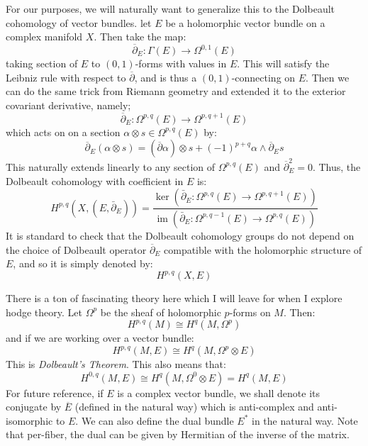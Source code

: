 \documentclass{book}
\newcommand{\im}{{\operatorname{im}}}
\begin{document}
For our purposes, we will naturally want to generalize this to the Dolbeault cohomology of vector bundles. let
$E$ be a holomorphic vector bundle on a complex manifold $X$. Then take the map:
\[
  \overline{\partial}_E: \Gamma(E) \to \Omega^{0,1}(E)
\]
taking section of $E$ to $(0,1)$-forms with values in $E$. This will satisfy the Leibniz rule  with respect to
$\overline{\partial}$, and is thus a $(0,1)$-connecting on $E$. Then we can do the same trick from Riemann
geometry and extended it to  the exterior covariant derivative, namely;
\[
  \overline{\partial}_E: \Omega^{p,q}(E) \to \Omega^{p, q+1}(E)
\]
which acts on on a section $\alpha \otimes s \in \Omega^{p,q}(E)$ by:
\[
  \overline{\partial}_E(\alpha\otimes s) = (\overline{\partial}\alpha) \otimes s + (-1)^{p+q}\alpha \wedge
  \overline{\partial}_E s
\]
This naturally extends linearly to any section of $\Omega^{p,q}(E)$ and $\overline{\partial}_E^2 = 0$. Thus,
the Dolbeault cohomology with coefficient in $E$ is:
\[
H^{p,q}(X,(E,\bar{\partial}_E)) = \frac{\ker(\bar{\partial}_E : \Omega^{p,q}(E) \to \Omega^{p,q+1}(E))}{\im(\bar{\partial}_E : \Omega^{p,q-1}(E) \to \Omega^{p,q}(E))}
\]
It is standard to check that the Dolbeault cohomology groups do not depend on the choice of Dolbeault operator
$\overline{\partial}_E$ compatible with the holomorphic structure of $E$, and so it is simply denoted by:
\[
  H^{p,q}(X,E)
\]

There is a ton of fascinating theory here which I will leave for when I explore hodge theory. Let $\Omega^p$
be the sheaf of holomorphic $p$-forms on $M$.  Then:
\[
  H^{p,q}(M) \cong H^q(M, \Omega^p)
\]
and if we are working over a vector bundle:
\[
  H^{p,q}(M, E) \cong H^q(M, \Omega^p\otimes E)
\]
This is \emph{Dolbeault's Theorem}. This also means that:
\[
  H^{0,q}(M, E) \cong H^q(M, \Omega^0\otimes E) = H^q(M, E)
\]
For future reference, if $E$ is a complex vector bundle, we shall denote its conjugate by $\overline{E}$
(defined in the natural way) which is anti-complex and anti-isomorphic to $E$. We can also define the dual
bundle $E^*$ in the natural way. Note that per-fiber, the dual can be given by Hermitian of the inverse of the
matrix.
\end{document}
